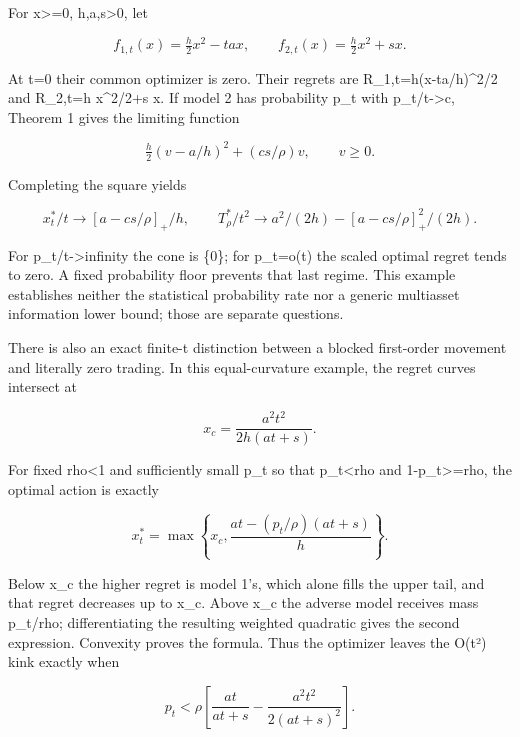 \documentclass[10pt]{article}
\begin{document}
For x>=0, h,a,s>0, let

\[
f_{1,t}(x)=\tfrac h2x^2-ta x,\qquad f_{2,t}(x)=\tfrac h2x^2+s x.
\]



At t=0 their common optimizer is zero. Their regrets are R\_1,t=h(x-ta/h)\textasciicircum{}2/2 and R\_2,t=h x\textasciicircum{}2/2+s x. If model 2 has probability p\_t with p\_t/t->c, Theorem 1 gives the limiting function

\[
\tfrac h2(v-a/h)^2+(cs/\rho)v,\qquad v\ge0.
\]



Completing the square yields

\begin{equation}
x_t^*/t\to[a-cs/\rho]_+/h,\qquad
T_\rho^*/t^2\to a^2/(2h)-[a-cs/\rho]_+^2/(2h).\tag{7}
\end{equation}



For p\_t/t->infinity the cone is \{0\}; for p\_t=o(t) the scaled optimal regret tends to zero. A fixed probability floor prevents that last regime. This example establishes neither the statistical probability rate nor a generic multiasset information lower bound; those are separate questions.

There is also an exact finite-t distinction between a blocked first-order movement and literally zero trading. In this equal-curvature example, the regret curves intersect at

\[
x_c=\frac{a^2t^2}{2h(at+s)}.
\]



For fixed rho<1 and sufficiently small p\_t so that p\_t<rho and 1-p\_t>=rho, the optimal action is exactly

\begin{equation}
x_t^*=\max\left\{x_c,\frac{at-(p_t/\rho)(at+s)}h\right\}.\tag{7a}
\end{equation}



Below x\_c the higher regret is model 1's, which alone fills the upper tail, and that regret decreases up to x\_c. Above x\_c the adverse model receives mass p\_t/rho; differentiating the resulting weighted quadratic gives the second expression. Convexity proves the formula. Thus the optimizer leaves the O(t²) kink exactly when

\begin{equation}
p_t<\rho\left[\frac{at}{at+s}-\frac{a^2t^2}{2(at+s)^2}\right].\tag{7b}
\end{equation}
\end{document}

